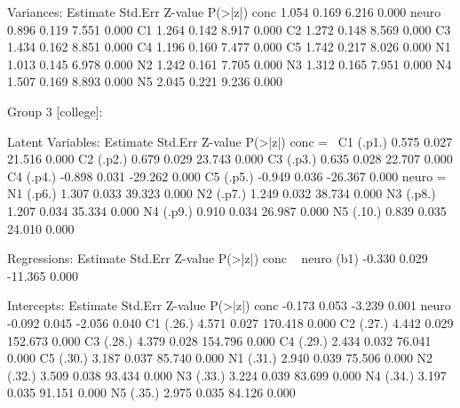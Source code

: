 \begin{Schunk}
\begin{Soutput}
Variances:
                   Estimate  Std.Err  Z-value  P(>|z|)
    conc              1.054    0.169    6.216    0.000
    neuro             0.896    0.119    7.551    0.000
    C1                1.264    0.142    8.917    0.000
    C2                1.272    0.148    8.569    0.000
    C3                1.434    0.162    8.851    0.000
    C4                1.196    0.160    7.477    0.000
    C5                1.742    0.217    8.026    0.000
    N1                1.013    0.145    6.978    0.000
    N2                1.242    0.161    7.705    0.000
    N3                1.312    0.165    7.951    0.000
    N4                1.507    0.169    8.893    0.000
    N5                2.045    0.221    9.236    0.000


Group 3 [college]:

Latent Variables:
                   Estimate  Std.Err  Z-value  P(>|z|)
  conc =~                                             
    C1      (.p1.)    0.575    0.027   21.516    0.000
    C2      (.p2.)    0.679    0.029   23.743    0.000
    C3      (.p3.)    0.635    0.028   22.707    0.000
    C4      (.p4.)   -0.898    0.031  -29.262    0.000
    C5      (.p5.)   -0.949    0.036  -26.367    0.000
  neuro =~                                            
    N1      (.p6.)    1.307    0.033   39.323    0.000
    N2      (.p7.)    1.249    0.032   38.734    0.000
    N3      (.p8.)    1.207    0.034   35.334    0.000
    N4      (.p9.)    0.910    0.034   26.987    0.000
    N5      (.10.)    0.839    0.035   24.010    0.000

Regressions:
                   Estimate  Std.Err  Z-value  P(>|z|)
  conc ~                                              
    neuro     (b1)   -0.330    0.029  -11.365    0.000

Intercepts:
                   Estimate  Std.Err  Z-value  P(>|z|)
    conc             -0.173    0.053   -3.239    0.001
    neuro            -0.092    0.045   -2.056    0.040
    C1      (.26.)    4.571    0.027  170.418    0.000
    C2      (.27.)    4.442    0.029  152.673    0.000
    C3      (.28.)    4.379    0.028  154.796    0.000
    C4      (.29.)    2.434    0.032   76.041    0.000
    C5      (.30.)    3.187    0.037   85.740    0.000
    N1      (.31.)    2.940    0.039   75.506    0.000
    N2      (.32.)    3.509    0.038   93.434    0.000
    N3      (.33.)    3.224    0.039   83.699    0.000
    N4      (.34.)    3.197    0.035   91.151    0.000
    N5      (.35.)    2.975    0.035   84.126    0.000


\end{Soutput}
\end{Schunk}
